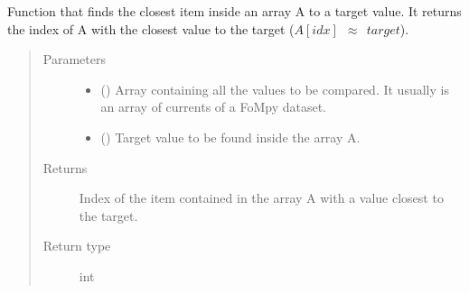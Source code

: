 \documentclass[letterpaper,10pt,english,openany, oneside]{sphinxmanual}
\begin{document}
\begin{fulllineitems}
\label{\detokenize{index:fompy.aux.find_closest}}
Function that finds the closest item inside an array A to a target value.
It returns the index of A with the closest value to the target (\(A[idx]~~{\approx}~~target\)).
\begin{quote}\begin{description}
\item[{Parameters}] \leavevmode\begin{itemize}
\item {} 
 () \textendash{} Array containing all the values to be compared. It usually is
an array of currents of a FoMpy dataset.

\item {} 
 () \textendash{} Target value to be found inside the array A.

\end{itemize}

\item[{Returns}] \leavevmode
{} \textendash{} Index of the item contained in the array A with a value closest to the target.

\item[{Return type}] \leavevmode
int

\end{description}\end{quote}

\end{fulllineitems}

\end{document}
